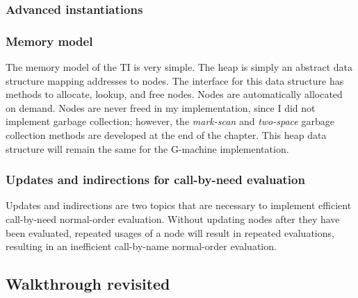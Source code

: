 \subsubsection{Advanced instantiations}
\label{sec:ti-advanced-instantiation}



\subsubsection{Memory model}
\label{sec:ti-memory}

The memory model of the TI is very simple. The heap is simply an abstract data structure mapping addresses to nodes. The interface for this data structure has methods to allocate, lookup, and free nodes. Nodes are automatically allocated on demand. Nodes are never freed in my implementation, since I did not implement garbage collection; however, the \textit{mark-scan} and \textit{two-space} garbage collection methods are developed at the end of the chapter. This heap data structure will remain the same for the G-machine implementation.

\subsubsection{Updates and indirections for call-by-need evaluation}
\label{sec:ti-updates}

Updates and indirections are two topics that are necessary to implement efficient call-by-need normal-order evaluation. Without updating nodes after they have been evaluated, repeated usages of a node will result in repeated evaluations, resulting in an inefficient call-by-name normal-order evaluation.


\subsection{Walkthrough revisited}
\label{sec:ti-walkthrough-revisited}


